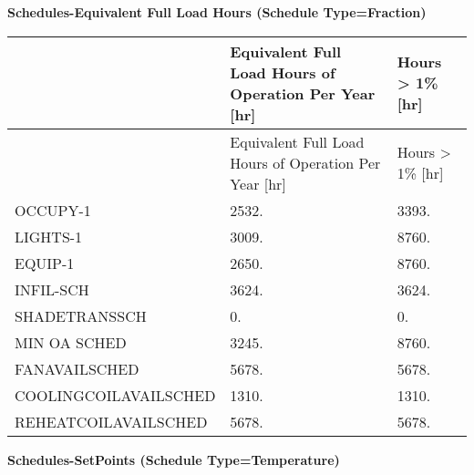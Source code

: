 \textbf{Schedules-Equivalent Full Load Hours (Schedule Type=Fraction)}
\begin{longtable}[c]{@{}lll@{}}

\toprule 
 & Equivalent Full Load Hours of Operation Per Year [hr] & Hours > 1\% [hr] \tabularnewline
\midrule
\endfirsthead

\toprule 
 & Equivalent Full Load Hours of Operation Per Year [hr] & Hours > 1\% [hr] \tabularnewline
\midrule
\endhead

    OCCUPY-1              &        2532.                                          &        3393.     \tabularnewline
    LIGHTS-1              &        3009.                                          &        8760.     \tabularnewline
    EQUIP-1               &        2650.                                          &        8760.     \tabularnewline
    INFIL-SCH             &        3624.                                          &        3624.     \tabularnewline
    SHADETRANSSCH         &           0.                                          &           0.     \tabularnewline
    MIN OA SCHED          &        3245.                                          &        8760.     \tabularnewline
    FANAVAILSCHED         &        5678.                                          &        5678.     \tabularnewline
    COOLINGCOILAVAILSCHED &        1310.                                          &        1310.     \tabularnewline
    REHEATCOILAVAILSCHED  &        5678.                                          &        5678.     \tabularnewline

\bottomrule
\end{longtable}

\textbf{Schedules-SetPoints (Schedule Type=Temperature)}

